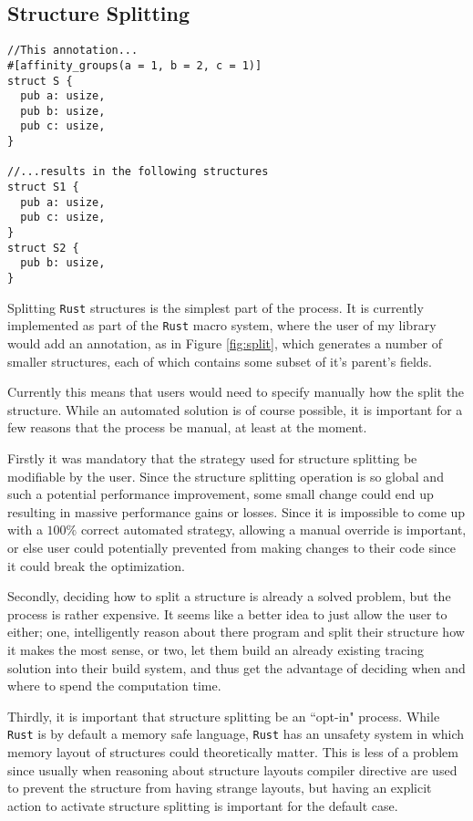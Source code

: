 \documentclass[12pt,final]{article}
\newcommand{\rustname}{{\texttt{Rust}}}
\def \rust {\rustname{}\xspace}
\begin{document}

\subsection{Structure Splitting}

\begin{figure*}
\begin{verbatim}
//This annotation...
#[affinity_groups(a = 1, b = 2, c = 1)]
struct S {
  pub a: usize,
  pub b: usize,
  pub c: usize,
}

//...results in the following structures
struct S1 {
  pub a: usize,
  pub c: usize,
}
struct S2 {
  pub b: usize,
}
\end{verbatim}
  \caption{Structure Splitting as a macro}
  \label{fig:split}
\end{figure*}
Splitting \rust structures is the simplest part of the process. It is currently
implemented as part of the \rust macro system, where the user of my library
would add an annotation, as in Figure \ref{fig:split}, which generates a number
of smaller structures, each of which contains some subset of it's parent's fields.

Currently this means
that users would need to specify manually how the split the structure. While an
automated solution is of course possible, it is important for a few reasons that
the process be manual, at least at the moment. 

Firstly it was mandatory that the strategy used for structure splitting be modifiable by the user.
Since the structure splitting operation is so global and such a potential performance improvement,
some small change could end up resulting in massive performance gains or losses. Since it is impossible
to come up with a $100\%$ correct automated strategy, allowing a manual override is important, or else
user could potentially prevented from making changes to their code
since it could break the optimization.

Secondly, deciding how to split a structure is already a solved problem,
but the process is rather expensive. It seems like a better idea to just allow the user to either; one, 
intelligently reason about there program and split their structure how it makes the most sense, or two, 
let them build an already existing tracing solution into their build system, and thus get the advantage
of deciding when and where to spend the computation time.

Thirdly, it is important that structure splitting be an ``opt-in" process.
While \rust is by default a memory safe language, \rust has an
unsafety system in which memory layout of structures could theoretically matter.
This is less of a problem since usually when reasoning about structure layouts
compiler directive are used to prevent the structure from having strange
layouts, but having an explicit action to activate structure
splitting is important for the default case. 
\end{document}

